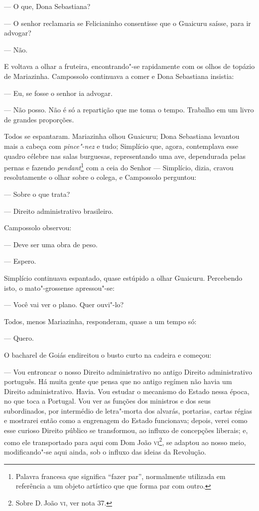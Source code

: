 --- O que, Dona Sebastiana?

--- O senhor reclamaria se Felicianinho consentisse que o Guaicuru
saísse, para ir advogar?

--- Não.

E voltava a olhar a fruteira, encontrando"-se rapidamente com os olhos de
topázio de Mariazinha. Campossolo continuava a comer e Dona Sebastiana
insistia:

--- Eu, se fosse o senhor ia advogar.

--- Não posso. Não é só a repartição que me toma o tempo. Trabalho em um
livro de grandes proporções.

Todos se espantaram. Mariazinha olhou Guaicuru; Dona Sebastiana levantou
mais a cabeça com \emph{pince"-nez} e tudo; Simplício que, agora,
contemplava esse quadro célebre nas salas burguesas, representando uma
ave, dependurada pelas pernas e fazendo \emph{pendant}\footnote{Palavra
  francesa que significa ``fazer par'', normalmente utilizada em
  referência a um objeto artístico que que forma par com outro.} com a
ceia do Senhor --- Simplício, dizia, cravou resolutamente o olhar sobre o
colega, e Campossolo perguntou:

--- Sobre o que trata?

--- Direito administrativo brasileiro.

Campossolo observou:

--- Deve ser uma obra de peso.

--- Espero.

Simplício continuava espantado, quase estúpido a olhar Guaicuru.
Percebendo isto, o mato"-grossense apressou"-se:

--- Você vai ver o plano. Quer ouvi"-lo?

Todos, menos Mariazinha, responderam, quase a um tempo só:

--- Quero.

O bacharel de Goiás endireitou o busto curto na cadeira e começou:

--- Vou entroncar o nosso Direito administrativo no antigo Direito
administrativo português. Há muita gente que pensa que no antigo regímen
não havia um Direito administrativo. Havia. Vou estudar o mecanismo do
Estado nessa época, no que toca a Portugal. Vou ver as funções dos
ministros e dos seus subordinados, por intermédio de letra"-morta dos
alvarás, portarias, cartas régias e mostrarei então como a engrenagem do
Estado funcionava; depois, verei como esse curioso Direito público se
transformou, ao influxo de concepções liberais; e, como ele transportado
para aqui com Dom João \textsc{vi}\footnote{Sobre D.\,João \textsc{vi}, ver nota 37.}, se
adaptou ao nosso meio, modificando"-se aqui ainda, sob o influxo das
ideias da Revolução.


